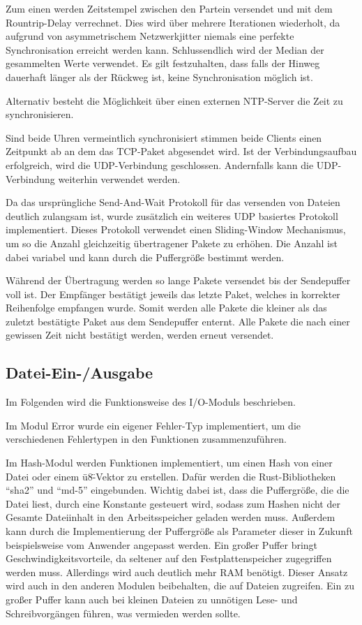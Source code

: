 Zum einen werden Zeitstempel zwischen den Partein versendet und mit dem Rountrip-Delay verrechnet. Dies wird über mehrere Iterationen wiederholt, da aufgrund von asymmetrischem Netzwerkjitter niemals eine perfekte Synchronisation erreicht werden kann. Schlussendlich wird der Median der gesammelten Werte verwendet. Es gilt festzuhalten, dass falls der Hinweg dauerhaft länger als der Rückweg ist, keine Synchronisation möglich ist.

Alternativ besteht die Möglichkeit über einen externen NTP-Server die Zeit zu synchronisieren.

Sind beide Uhren vermeintlich synchronisiert stimmen beide Clients einen Zeitpunkt ab an dem das TCP-Paket abgesendet wird. Ist der Verbindungsaufbau erfolgreich, wird die UDP-Verbindung geschlossen. Andernfalls kann die UDP-Verbindung weiterhin verwendet werden.

Da das ursprüngliche Send-And-Wait Protokoll für das versenden von Dateien deutlich zulangsam ist, wurde zusätzlich ein weiteres UDP basiertes Protokoll implementiert. Dieses Protokoll verwendet einen Sliding-Window Mechanismus, um so die Anzahl gleichzeitig übertragener Pakete zu erhöhen. Die Anzahl ist dabei variabel und kann durch die Puffergröße bestimmt werden.

Während der Übertragung werden so lange Pakete versendet bis der Sendepuffer voll ist. Der Empfänger bestätigt jeweils das letzte Paket, welches in korrekter Reihenfolge empfangen wurde. Somit werden alle Pakete die kleiner als das zuletzt bestätigte Paket aus dem Sendepuffer enternt. Alle Pakete die nach einer gewissen Zeit nicht bestätigt werden, werden erneut versendet.

\subsection{Datei-Ein-/Ausgabe}
Im Folgenden wird die Funktionsweise des I/O-Moduls beschrieben.

Im Modul Error wurde ein eigener Fehler-Typ implementiert, um die verschiedenen Fehlertypen in den Funktionen zusammenzuführen.

Im Hash-Modul werden Funktionen implementiert, um einen Hash von einer Datei oder einem \"u8\"-Vektor zu erstellen. Dafür werden die Rust-Bibliotheken \enquote{sha2} und \enquote{md-5} eingebunden. 
Wichtig dabei ist, dass die Puffergröße, die die Datei liest, durch eine Konstante gesteuert wird, sodass zum Hashen nicht der Gesamte Dateiinhalt in den Arbeitsspeicher geladen werden muss.
Außerdem kann durch die Implementierung der Puffergröße als Parameter dieser in Zukunft beispielsweise vom Anwender angepasst werden. Ein großer Puffer bringt Geschwindigkeitsvorteile, da seltener auf den Festplattenspeicher zugegriffen werden muss. Allerdings wird auch deutlich mehr RAM benötigt. Dieser Ansatz wird auch in den anderen Modulen beibehalten, die auf Dateien zugreifen. Ein zu großer Puffer kann auch bei kleinen Dateien zu unnötigen Lese- und Schreibvorgängen führen, was vermieden werden sollte.

